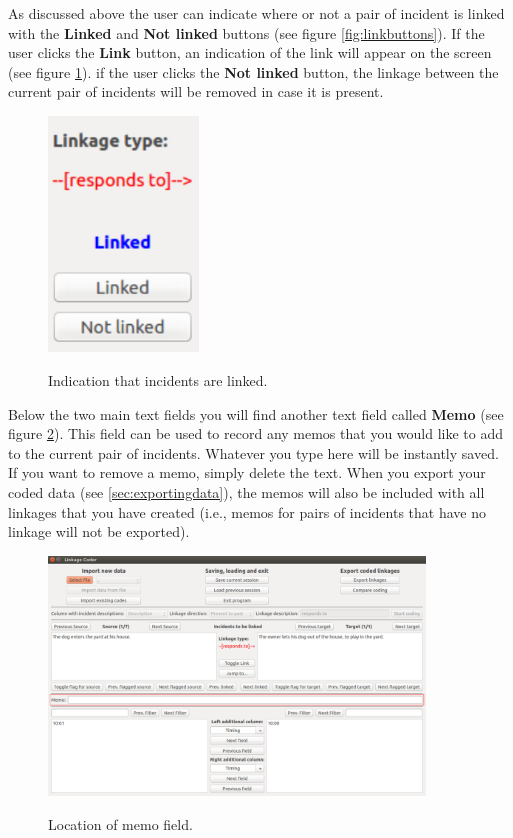 \documentclass{memoir}
\begin{document}
As discussed above the user can indicate where or not a pair of incident is linked with the \textbf{Linked} and \textbf{Not linked} buttons (see figure \ref{fig:linkbuttons}). If the user clicks the \textbf{Link} button, an indication of the link will appear on the screen (see figure \ref{fig:linkage}). if the user clicks the \textbf{Not linked} button, the linkage between the current pair of incidents will be removed in case it is present. 

\begin{figure}[h!]
  \centering
  \caption{Indication that incidents are linked.}
  \includegraphics[width=40mm]{Screenshot_10.pdf}
  \label{fig:linkage}
\end{figure}

Below the two main text fields you will find another text field called \textbf{Memo} (see figure \ref{fig:memo}). This field can be used to record any memos that you would like to add to the current pair of incidents. Whatever you type here will be instantly saved. If you want to remove a memo, simply delete the text. When you export your coded data (see \ref{sec:exportingdata}), the memos will also be included with all linkages that you have created (i.e., memos for pairs of incidents that have no linkage will not be exported). 

\begin{figure}[h!]
  \centering
  \caption{Location of memo field.}
  \includegraphics[width=100mm]{Screenshot_11.pdf}
  \label{fig:memo}
\end{figure}
\end{document}
